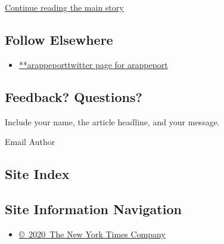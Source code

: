 \protect\hyperlink{after-mid2}{Continue reading the main story}

\hypertarget{follow-elsewhere}{%
\subsection{Follow Elsewhere}\label{follow-elsewhere}}

\begin{itemize}
\tightlist
\item
  \href{https://twitter.com/arappeport}{**arappeporttwitter page for
  arappeport}
\end{itemize}

\hypertarget{feedback-questions}{%
\subsection{Feedback? Questions?}\label{feedback-questions}}

Include your name, the article headline, and your message.

Email Author

\hypertarget{site-index}{%
\subsection{Site Index}\label{site-index}}

\hypertarget{site-information-navigation}{%
\subsection{Site Information
Navigation}\label{site-information-navigation}}

\begin{itemize}
\tightlist
\item
  \href{https://help.nytimes3xbfgragh.onion/hc/en-us/articles/115014792127-Copyright-notice}{©~2020~The
  New York Times Company}
\end{itemize}

